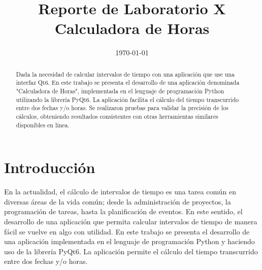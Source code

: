 \documentclass[conference]{IEEEtran}
\date{\specialdate\today}
\begin{document}
\newcommand{\breite}{0.9} %
\newcommand{\RelacionFiguradoscolumnas}{0.9}
\newcommand{\RelacionFiguradoscolumnasPuntoCinco}{0.45}

\title{Reporte de Laboratorio X \\ Calculadora de Horas}

\author{
}

\maketitle

\begin{abstract} 
    Dada la necesidad de calcular intervalos de tiempo con una aplicación que use una interfaz Qt6. En este trabajo se presenta el desarrollo de una aplicación denominada "Calculadora de Horas", implementada en el lenguaje de programación Python utilizando la librería PyQt6. La aplicación facilita el cálculo del tiempo transcurrido entre dos fechas y/o horas. Se realizaron pruebas para validar la precisión de los cálculos, obteniendo resultados consistentes con otras herramientas similares disponibles en línea\cite{calculator}.
\end{abstract}

\section{Introducción}
    En la actualidad, el cálculo de intervalos de tiempo es una tarea común en diversas áreas de la vida común; desde la administración de proyectos, la programación de tareas, hasta la planificación de eventos. En este sentido, el desarrollo de una aplicación que permita calcular intervalos de tiempo de manera fácil se vuelve en algo con utilidad. En este trabajo se presenta el desarrollo de una aplicación implementada en el lenguaje de programación Python y haciendo uso de la librería PyQt6. La aplicación permite el cálculo del tiempo transcurrido entre dos fechas y/o horas.
\end{document}
